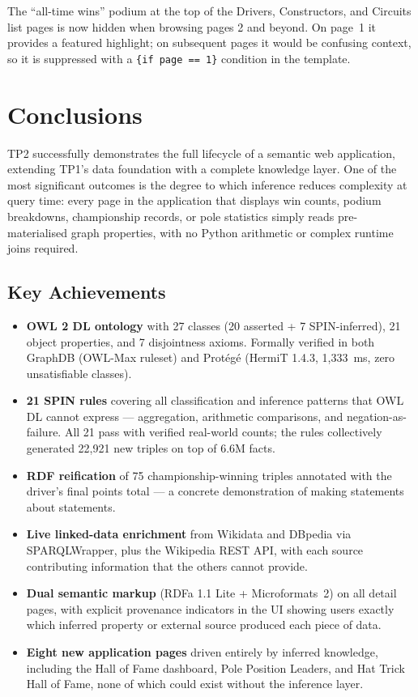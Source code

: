\documentclass[12pt,a4paper]{article}
\begin{document}
The ``all-time wins'' podium at the top of the Drivers, Constructors, and Circuits
list pages is now hidden when browsing pages 2 and beyond. On page~1 it provides
a featured highlight; on subsequent pages it would be confusing context, so it is
suppressed with a \texttt{\{if page == 1\}} condition in the template.

\section{Conclusions}

TP2 successfully demonstrates the full lifecycle of a semantic web application,
extending TP1's data foundation with a complete knowledge layer. One of the most
significant outcomes is the degree to which inference reduces complexity at query
time: every page in the application that displays win counts, podium breakdowns,
championship records, or pole statistics simply reads pre-materialised graph
properties, with no Python arithmetic or complex runtime joins required.

\subsection{Key Achievements}

\begin{itemize}[leftmargin=1.5em]
  \item \textbf{OWL 2 DL ontology} with 27 classes (20 asserted + 7 SPIN-inferred),
        21 object properties, and 7 disjointness axioms.
        Formally verified in both GraphDB (OWL-Max ruleset) and Protégé
        (HermiT 1.4.3, 1{,}333~ms, zero unsatisfiable classes).
  \item \textbf{21 SPIN rules} covering all classification and inference patterns
        that OWL DL cannot express --- aggregation, arithmetic comparisons, and
        negation-as-failure. All 21 pass with verified real-world counts;
        the rules collectively generated 22{,}921 new triples on top of 6.6M facts.
  \item \textbf{RDF reification} of 75 championship-winning triples annotated with
        the driver's final points total --- a concrete demonstration of making
        statements about statements.
  \item \textbf{Live linked-data enrichment} from Wikidata and DBpedia via
        SPARQLWrapper, plus the Wikipedia REST API, with each source contributing
        information that the others cannot provide.
  \item \textbf{Dual semantic markup} (RDFa 1.1 Lite + Microformats~2) on all detail
        pages, with explicit provenance indicators in the UI showing users exactly
        which inferred property or external source produced each piece of data.
  \item \textbf{Eight new application pages} driven entirely by inferred knowledge,
        including the Hall of Fame dashboard, Pole Position Leaders, and
        Hat Trick Hall of Fame, none of which could exist without the inference layer.
\end{itemize}
\end{document}
